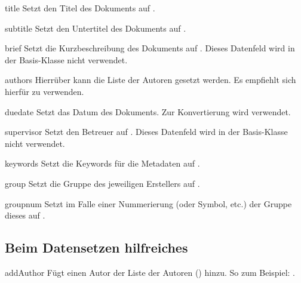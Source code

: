\documentclass{sopra-base}
\begin{document}
\begin{command}{title}{}
    Setzt den Titel des Dokuments auf .
\end{command}

\begin{command}{subtitle}{}
    Setzt den Untertitel des Dokuments auf .
\end{command}

\begin{command}{brief}{}
    Setzt die Kurzbeschreibung des Dokuments auf .
    Dieses Datenfeld wird in der Basis-Klasse nicht verwendet.
\end{command}

\begin{command}{authors}{}
    Hierrüber kann die Liste der Autoren gesetzt werden. Es empfiehlt sich
    hierfür  zu verwenden.
\end{command}

\begin{command}{duedate}{}
   Setzt das Datum des Dokuments. Zur Konvertierung wird 
   verwendet.
\end{command}

\begin{command}{supervisor}{}
    Setzt den Betreuer auf . Dieses Datenfeld wird in der Basis-Klasse nicht verwendet.
\end{command}

\begin{command}{keywords}{}
    Setzt die Keywords für die Metadaten auf .
\end{command}

\begin{command}{group}{}
    Setzt die Gruppe des jeweiligen Erstellers auf .
\end{command}

\begin{command}{groupnum}{}
    Setzt im Falle einer Nummerierung (oder Symbol, etc.) der Gruppe dieses
    auf .
\end{command}

\subsection{Beim Datensetzen hilfreiches}
\begin{command}{addAuthor}{}
    Fügt einen Autor der Liste der Autoren () hinzu. So zum
    Beispiel: .
\end{command}
\end{document}
